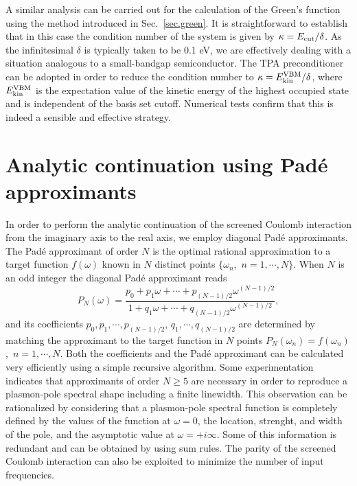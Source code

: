 \documentclass[twocolumn,prb,showpacs,superscriptaddress]{revtex4}
\def\w{\omega}
\begin{document}
A similar analysis can be carried out for the calculation of the Green's
function using the method introduced in Sec.\ \ref{sec.green}.
It is straightforward to establish that in this case the condition number
of the system is given by $\kappa = E_{\rm cut}/\delta$.
As the infinitesimal $\delta$ is typically taken to be 0.1 eV, we are effectively
dealing with a situation analogous to a small-bandgap semiconductor.
The TPA preconditioner can be adopted in order to reduce the condition number
to $\kappa = E_{\rm kin}^{\rm VBM}/\delta$, where $E_{\rm kin}^{\rm VBM}$
is the expectation value of the kinetic energy of the highest occupied state
and is independent of the basis set cutoff. Numerical tests confirm that this 
is indeed a sensible and effective strategy.

\section{Analytic continuation using Pad\'e approximants}\label{app.pade}

In order to perform the analytic continuation of the screened Coulomb interaction
from the imaginary axis to the real axis, we employ diagonal 
Pad\'e approximants.\cite{pade1,pade2,blochl}
The Pad\'e approximant of order $N$ is the optimal rational approximation
to a target function $f(\w)$ known in $N$ distinct points 
$\{\w_n$,~$n=1,\cdots,N\}$. 
When $N$ is an odd integer the diagonal Pad\'e approximant reads
  \begin{equation}
  P_N(\w) = \frac{p_0+p_1\w+\cdots+p_{(N-1)/2}\w^{(N-1)/2}}
  {1+q_1\w+\cdots+q_{(N-1)/2}\w^{(N-1)/2}},
  \end{equation}
and its coefficients $p_0, p_1, \cdots, p_{(N-1)/2}$, $q_1, \cdots, q_{(N-1)/2}$ are determined by matching the approximant
to the target function in $N$ points $P_N(\w_n)=f(\w_n)$,~$n=1,\cdots,N$.
Both the coefficients and the Pad\'e approximant can be calculated
very efficiently using a simple recursive algorithm.\cite{pade2}
Some experimentation indicates that approximants of order $N\ge5$ are necessary
in order to reproduce a plasmon-pole spectral shape including a finite linewidth.
This observation can be rationalized by considering that a plasmon-pole
spectral function is completely defined by the values of the function at $\w=0$,
the location, strenght, and width of the pole, and the asymptotic value at $\w=+i\infty$.
Some of this information is redundant and can be obtained by using sum rules.\cite{hl86}
The parity of the screened Coulomb interaction can also be exploited to minimize
the number of input frequencies. 
\end{document}
